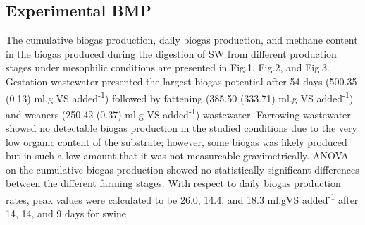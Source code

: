 \subsection{Experimental BMP}
The cumulative biogas production, daily biogas production, and methane content in the biogas produced during the digestion of SW from different production stages under mesophilic conditions are presented in Fig.1, Fig.2, and Fig.3. Gestation wastewater presented the largest biogas potential after 54 days (500.35 (0.13) ml.g VS added\textsuperscript{-1}) followed by fattening (385.50 (333.71) ml.g VS added\textsuperscript{-1}) and weaners (250.42 (0.37) ml.g VS added\textsuperscript{-1}) wastewater. Farrowing wastewater showed no detectable biogas production in the studied conditions due to the very low organic content of the substrate; however, some biogas was likely produced but in such a low amount that it was not measureable gravimetrically.  ANOVA on the cumulative biogas production showed no statistically significant differences between the different farming stages. With respect to daily biogas production rates, peak values were calculated to be 26.0, 14.4, and 18.3 ml.gVS added\textsuperscript{-1} after 14, 14, and 9 days for swine 